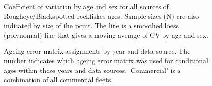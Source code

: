 \documentclass[
]{scrartcl}
\begin{document}
\begin{figure}[H]


\caption{\label{fig-AL_2}Coefficient of variation by age and sex for all
sources of Rougheye/Blackspotted rockfishes ages. Sample sizes (N) are
also indicated by size of the point. The line is a smoothed loess
(polynomial) line that gives a moving average of CV by age and sex.}

\end{figure}%

\begin{figure}[H]


\caption{\label{fig-AE_matrices}Ageing error matrix assignments by year
and data source. The number indicates which ageing error matrix was used
for conditional ages within those years and data sources. `Commercial'
is a combination of all commercial fleets.}

\end{figure}%
\end{document}
